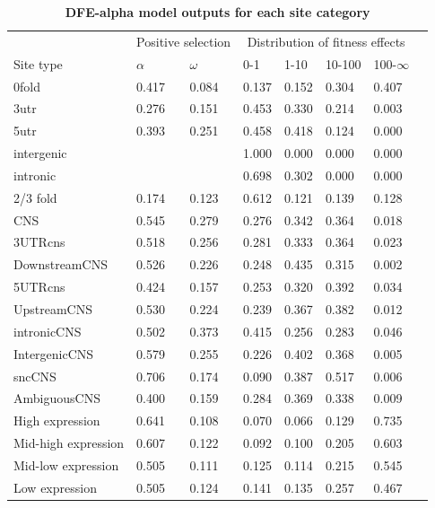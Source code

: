 \begin{table}[ht!]
\centering
\begin{tabular}{l l l l l l l l} 
\hline
 &\multicolumn{2}{c}{Positive selection} & \multicolumn{4}{c}{Distribution of fitness effects} \\ [0.5ex]
Site type & $\alpha$& 	$\omega$& 		0-1& 	1-10& 	10-100& 	100-$\infty$ \\ [0.5ex]
\hline
0fold & 0.417 & 0.084 & 0.137 & 0.152 & 0.304 & 0.407 \\ 
  3utr & 0.276 & 0.151 & 0.453 & 0.330 & 0.214 & 0.003 \\ 
  5utr & 0.393 & 0.251 & 0.458 & 0.418 & 0.124 & 0.000 \\ 
  intergenic &  &  & 1.000 & 0.000 & 0.000 & 0.000 \\ 
  intronic &  &  & 0.698 & 0.302 & 0.000 & 0.000 \\ 
  2/3 fold & 0.174 & 0.123 & 0.612 & 0.121 & 0.139 & 0.128 \\ 
  CNS & 0.545 & 0.279 & 0.276 & 0.342 & 0.364 & 0.018 \\ 
  3UTRcns & 0.518 & 0.256 & 0.281 & 0.333 & 0.364 & 0.023 \\ 
  DownstreamCNS & 0.526 & 0.226 & 0.248 & 0.435 & 0.315 & 0.002 \\ 
  5UTRcns & 0.424 & 0.157 & 0.253 & 0.320 & 0.392 & 0.034 \\ 
  UpstreamCNS & 0.530 & 0.224 & 0.239 & 0.367 & 0.382 & 0.012 \\ 
  intronicCNS & 0.502 & 0.373 & 0.415 & 0.256 & 0.283 & 0.046 \\ 
  IntergenicCNS & 0.579 & 0.255 & 0.226 & 0.402 & 0.368 & 0.005 \\ 
  sncCNS & 0.706 & 0.174 & 0.090 & 0.387 & 0.517 & 0.006 \\ 
  AmbiguousCNS & 0.400 & 0.159 & 0.284 & 0.369 & 0.338 & 0.009 \\ 
  High expression & 0.641 & 0.108 & 0.070 & 0.066 & 0.129 & 0.735 \\ 
  Mid-high expression & 0.607 & 0.122 & 0.092 & 0.100 & 0.205 & 0.603 \\ 
  Mid-low expression & 0.505 & 0.111 & 0.125 & 0.114 & 0.215 & 0.545 \\ 
  Low expression & 0.505 & 0.124 & 0.141 & 0.135 & 0.257 & 0.467 \\ 
   \hline
\end{tabular}
\caption{\textbf{DFE-alpha model outputs for each site category}}
\label{table:s2}
\end{table}


